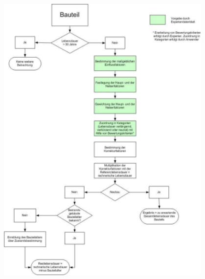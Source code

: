 \documentclass[fleqn,twoside,dvipsnames]{article}
\begin{document}
\begin{itemize}
\begin{itemize}
\begin{minipage}{0.5\textwidth}
                        \end{minipage}
                    \begin{minipage}{0.5\textwidth}
                        \includegraphics[width=0.8\textwidth]{Grafiken/Verfahren zur Bestimmung von Bauteillebensdauern/Entscheidungsfluss Restlebensdauer.png}
                    \end{minipage}
                \end{itemize}
        \end{itemize}
\end{document}

